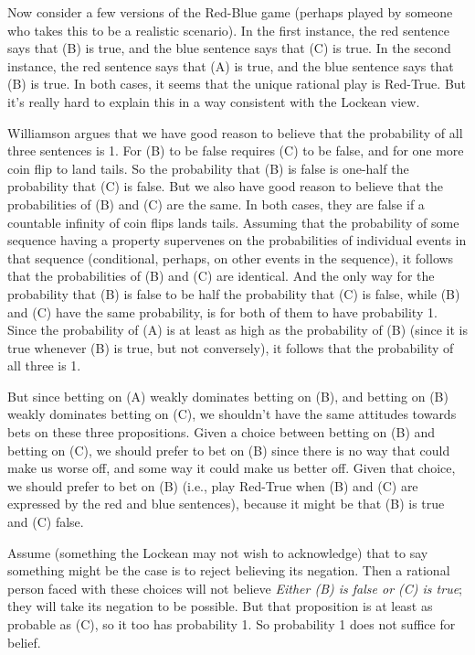 \documentclass[11pt,]{book}
\begin{document}
Now consider a few versions of the Red-Blue game (perhaps played by someone who takes this to be a realistic scenario). In the first instance, the red sentence says that (B) is true, and the blue sentence says that (C) is true. In the second instance, the red sentence says that (A) is true, and the blue sentence says that (B) is true. In both cases, it seems that the unique rational play is Red-True. But it's really hard to explain this in a way consistent with the Lockean view.

Williamson argues that we have good reason to believe that the probability of all three sentences is 1. For (B) to be false requires (C) to be false, and for one more coin flip to land tails. So the probability that (B) is false is one-half the probability that (C) is false. But we also have good reason to believe that the probabilities of (B) and (C) are the same. In both cases, they are false if a countable infinity of coin flips lands tails. Assuming that the probability of some sequence having a property supervenes on the probabilities of individual events in that sequence (conditional, perhaps, on other events in the sequence), it follows that the probabilities of (B) and (C) are identical. And the only way for the probability that (B) is false to be half the probability that (C) is false, while (B) and (C) have the same probability, is for both of them to have probability 1. Since the probability of (A) is at least as high as the probability of (B) (since it is true whenever (B) is true, but not conversely), it follows that the probability of all three is 1.

But since betting on (A) weakly dominates betting on (B), and betting on (B) weakly dominates betting on (C), we shouldn't have the same attitudes towards bets on these three propositions. Given a choice between betting on (B) and betting on (C), we should prefer to bet on (B) since there is no way that could make us worse off, and some way it could make us better off. Given that choice, we should prefer to bet on (B) (i.e., play Red-True when (B) and (C) are expressed by the red and blue sentences), because it might be that (B) is true and (C) false.

Assume (something the Lockean may not wish to acknowledge) that to say something might be the case is to reject believing its negation. Then a rational person faced with these choices will not believe \emph{Either (B) is false or (C) is true}; they will take its negation to be possible. But that proposition is at least as probable as (C), so it too has probability 1. So probability 1 does not suffice for belief.
\end{document}
